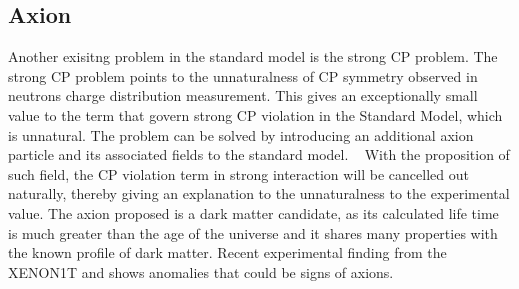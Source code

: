 
\subsection{Axion}
Another exisitng problem in the standard model is the strong CP problem. The strong CP problem points to the unnaturalness of CP symmetry observed in neutrons charge distribution measurement. This gives an exceptionally small value to the term that govern strong CP violation in the Standard Model, which is unnatural. The problem can be solved by introducing an additional axion particle and its associated fields to the standard model. ~\cite{peccei1977cp} With the proposition of such field, the CP violation term in strong interaction will be cancelled out naturally, thereby giving an explanation to the unnaturalness to the experimental value. 
The axion proposed is a dark matter candidate, as its calculated life time is much greater than the age of the universe and it shares many properties with the known profile of dark matter. Recent experimental finding from the XENON1T and shows anomalies that could be signs of axions. ~\cite{aprile2020excess}




